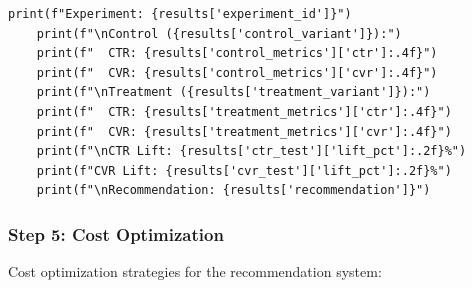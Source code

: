 \begin{lstlisting}[style=python, caption=A/B Test Analysis]
    print(f"Experiment: {results['experiment_id']}")
    print(f"\nControl ({results['control_variant']}):")
    print(f"  CTR: {results['control_metrics']['ctr']:.4f}")
    print(f"  CVR: {results['control_metrics']['cvr']:.4f}")
    print(f"\nTreatment ({results['treatment_variant']}):")
    print(f"  CTR: {results['treatment_metrics']['ctr']:.4f}")
    print(f"  CVR: {results['treatment_metrics']['cvr']:.4f}")
    print(f"\nCTR Lift: {results['ctr_test']['lift_pct']:.2f}%")
    print(f"CVR Lift: {results['cvr_test']['lift_pct']:.2f}%")
    print(f"\nRecommendation: {results['recommendation']}")
\end{lstlisting}

\subsubsection*{Step 5: Cost Optimization}

Cost optimization strategies for the recommendation system:

